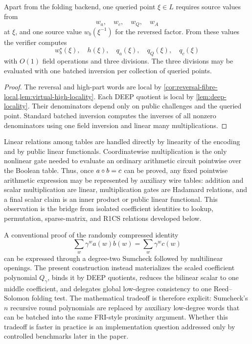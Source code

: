 \begin{proposition}
\label{prop:had-local-verifier-work}
Apart from the folding backend, one queried point $\xi\in L$ requires source values from
\[
  w_a,\quad w_c,\quad w_Q,\quad w_A
\]
at $\xi$, and one source value $w_b(\xi^{-1})$ for the reversed factor.  From these values the verifier computes
\[
  w_b^{\star}(\xi),\quad h(\xi),\quad q_a(\xi),\quad q_Q(\xi),\quad q_c(\xi)
\]
with $O(1)$ field operations and three divisions.  The three divisions may be evaluated with one batched inversion per collection of queried points.
\end{proposition}

\begin{proof}
The reversal and high-part words are local by \cref{cor:reversal-fibre-local,lem:virtual-high-locality}.  Each DEEP quotient is local by \cref{lem:deep-locality}.  Their denominators depend only on public challenges and the queried point.  Standard batched inversion computes the inverses of all nonzero denominators using one field inversion and linear many multiplications.
\end{proof}

\begin{remark}
\label{rem:had-multiplication-gate}
Linear relations among tables are handled directly by linearity of the encoding and by public linear functionals.  Coordinatewise multiplication is the only nonlinear gate needed to evaluate an ordinary arithmetic circuit pointwise over the Boolean table.  Thus, once $a\circ b=c$ can be proved, any fixed pointwise arithmetic expression may be represented by auxiliary wire tables: addition and scalar multiplication are linear, multiplication gates are Hadamard relations, and a final scalar claim is an inner product or public linear functional.  This observation is the bridge from isolated coefficient identities to lookup, permutation, sparse-matrix, and R1CS relations developed below.
\end{remark}

\begin{remark}
\label{rem:had-vs-sumcheck}
A conventional proof of the randomly compressed identity
\[
  \sum_w\gamma^w a(w)b(w)=\sum_w\gamma^w c(w)
\]
can be expressed through a degree-two Sumcheck followed by multilinear openings.  The present construction instead materializes the scaled coefficient polynomial $Q_\gamma$, binds it by DEEP quotients, reduces the bilinear scalar to one middle coefficient, and delegates global low-degree consistency to one Reed--Solomon folding test.  The mathematical tradeoff is therefore explicit: Sumcheck's $n$ recursive round polynomials are replaced by auxiliary low-degree words that can be batched into the same FRI-style proximity argument.  Whether this tradeoff is faster in practice is an implementation question addressed only by controlled benchmarks later in the paper.
\end{remark}

